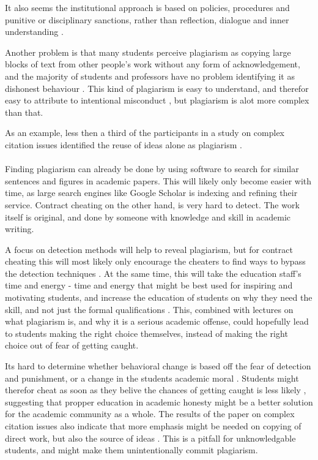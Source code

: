 \documentclass[12pt,a4paper]{article}
\begin{document}
It also seems the institutional approach is based on policies, procedures and punitive or disciplinary sanctions, rather than reflection, dialogue and inner understanding \cite{Dalal2015}.

Another problem is that many students perceive plagiarism as copying large blocks of text from other people's work without any form of acknowledgement, and the majority of students and professors have no problem identifying it as dishonest behaviour \cite{Childers2016}. This kind of plagiarism is easy to understand, and therefor easy to attribute to intentional misconduct \cite{Childers2016}, but plagiarism is alot more complex than that.

As an example, less then a third of the participants in a study on complex citation issues identified the reuse of ideas alone as plagiarism \cite{Childers2016}.
\\ \\ %
Finding plagiarism can already be done by using software to search for similar sentences and figures in academic papers. This will likely only become easier with time, as large search engines like Google Scholar is indexing and refining their service. Contract cheating on the other hand, is very hard to detect. The work itself is original, and done by someone with knowledge and skill in academic writing. 

A focus on detection methods will help to reveal plagiarism, but for contract cheating this will most likely only encourage the cheaters to find ways to bypass the detection techniques \cite{Walker2012}. At the same time, this will take the education staff's time and energy - time and energy that might be best used for inspiring and motivating students, and increase the education of students on why they need the skill, and not just the formal qualifications \cite{Walker2012}. This, combined with lectures on what plagiarism is, and why it is a serious academic offense, could hopefully lead to students making the right choice themselves, instead of making the right choice out of fear of getting caught. 

Its hard to determine whether behavioral change is based off the fear of detection and punishment, or a change in the students academic moral \cite{Dalal2015}. Students might therefor cheat as soon as they belive the chances of getting caught is less likely \cite{Dalal2015}, suggesting that propper education in academic honesty might be a better solution for the academic community as a whole. The results of the paper on complex citation issues also indicate that more emphasis might be needed on copying of direct work, but also the source of ideas \cite{Childers2016}. This is a pitfall for unknowledgable students, and might make them unintentionally commit plagiarism.
\end{document}

